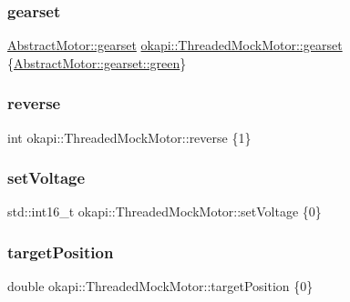 \subsubsection{\texorpdfstring{gearset}{gearset}}
{\footnotesize\ttfamily \mbox{\hyperlink{classokapi_1_1AbstractMotor_a88aaa6ea2fa10f5520a537bbf26774d5}{Abstract\+Motor\+::gearset}} \mbox{\hyperlink{classokapi_1_1AbstractMotor_a88aaa6ea2fa10f5520a537bbf26774d5}{okapi\+::\+Threaded\+Mock\+Motor\+::gearset}} \{\mbox{\hyperlink{classokapi_1_1AbstractMotor_a88aaa6ea2fa10f5520a537bbf26774d5a9f27410725ab8cc8854a2769c7a516b8}{Abstract\+Motor\+::gearset\+::green}}\}}

\mbox{\label{classokapi_1_1ThreadedMockMotor_ac72037473d0f939b338f04e3f0fe140d}} 
\subsubsection{\texorpdfstring{reverse}{reverse}}
{\footnotesize\ttfamily int okapi\+::\+Threaded\+Mock\+Motor\+::reverse \{1\}}

\mbox{\label{classokapi_1_1ThreadedMockMotor_a69e26f6c4ceab552f948b05520315889}} 
\subsubsection{\texorpdfstring{setVoltage}{setVoltage}}
{\footnotesize\ttfamily std\+::int16\+\_\+t okapi\+::\+Threaded\+Mock\+Motor\+::set\+Voltage \{0\}}

\mbox{\label{classokapi_1_1ThreadedMockMotor_affa1069c6e9acdb02bd035ec1c3f91b4}} 
\subsubsection{\texorpdfstring{targetPosition}{targetPosition}}
{\footnotesize\ttfamily double okapi\+::\+Threaded\+Mock\+Motor\+::target\+Position \{0\}}

